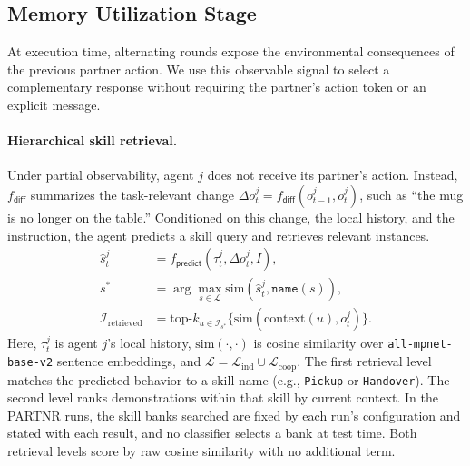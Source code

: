 \documentclass{article}
\theoremstyle{plain}
\theoremstyle{definition}
\theoremstyle{remark}
\begin{document}
\subsection{Memory Utilization Stage}
\label{subsec:utilization}
\label{subsec:memory_utilization}
 
At execution time, alternating rounds expose the environmental consequences of the previous partner action. We use this observable signal to select a complementary response without requiring the partner's action token or an explicit message.
 
\paragraph{Hierarchical skill retrieval.}
Under partial observability, agent $j$ does not receive its partner's action. Instead, $f_{\mathsf{diff}}$ summarizes the task-relevant change $\Delta o_t^j=f_{\mathsf{diff}}(o_{t-1}^j,o_t^j)$, such as ``the mug is no longer on the table.'' Conditioned on this change, the local history, and the instruction, the agent predicts a skill query and retrieves relevant instances.
\begin{equation}
\begin{aligned}
\hat{s}_t^j &= f_{\mathsf{predict}}(\tau_t^j, \Delta o_{t}^j, I), \\
s^* &= \arg\max_{s \in \mathcal{L}} \text{sim}(\hat{s}^j_t, \texttt{name}(s)), \\
\mathcal{I}_{\text{retrieved}} &= \text{top-}k_{u \in \mathcal{I}_{s^*}}
\{\text{sim}(\text{context}(u), o^j_t)\}.
\end{aligned}
\end{equation}
Here, $\tau_t^j$ is agent $j$'s local history, $\text{sim}(\cdot,\cdot)$ is cosine similarity over \texttt{all-mpnet-base-v2} sentence embeddings, and $\mathcal{L}=\mathcal{L}_{\text{ind}}\cup\mathcal{L}_{\text{coop}}$. The first retrieval level matches the predicted behavior to a skill name (e.g., \texttt{Pickup} or \texttt{Handover}). The second level ranks demonstrations within that skill by current context. In the PARTNR runs, the skill banks searched are fixed by each run's configuration and stated with each result, and no classifier selects a bank at test time. Both retrieval levels score by raw cosine similarity with no additional term.
 
 
\end{document}

